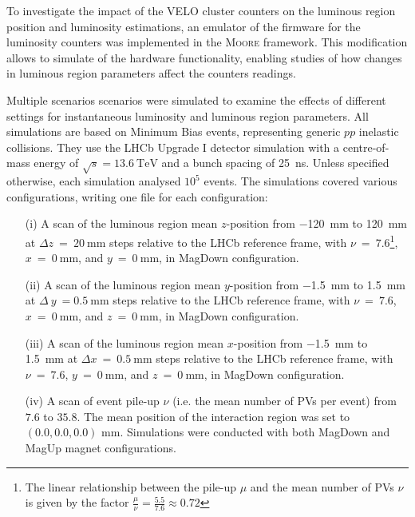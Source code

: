 To investigate the impact of the VELO cluster counters on the luminous region position and luminosity estimations, an emulator of the firmware for the luminosity counters was implemented in the \textsc{Moore} framework. This modification allows to simulate of the hardware functionality, enabling studies of how changes in luminous region parameters affect the counters readings.

Multiple scenarios scenarios were simulated to examine the effects of different settings for instantaneous luminosity and luminous region parameters. All simulations are based on Minimum Bias events, representing generic $pp$ inelastic collisions. They use the LHCb Upgrade I detector simulation with a centre-of-mass energy of $\sqrt{s} = \SI{13.6}{\tera\eV}$ and a bunch spacing of \SI{25}{\nano\second}. Unless specified otherwise, each simulation analysed $10^5$ events. The simulations covered various configurations, writing one file for each configuration:

\begin{enumerate}

    \item[(i)] A scan of the luminous region mean $z$-position from \SI{-120}{\milli\meter} to \SI{120}{\milli\meter} at $\Delta z~=~\SI{20}{\milli\meter}$ steps relative to the LHCb reference frame, with $\nu~=~7.6$\footnote{The linear relationship between the pile-up $\mu$ and the mean number of PVs $\nu$ is given by the factor $\tfrac{\mu}{\nu}=\frac{5.5}{7.6}\approx 0.72$}, $x~=~\SI{0}{\milli\meter}$, and $y~=~\SI{0}{\milli\meter}$, in MagDown configuration.

    \item[(ii)] A scan of the luminous region mean $y$-position from \SI{-1.5}{\milli\meter} to \SI{1.5}{\milli\meter} at $\Delta~y~=\SI{0.5}{\milli\meter}$ steps relative to the LHCb reference frame, with $\nu~=~7.6$, $x~=~\SI{0}{\milli\meter}$, and $z~=~\SI{0}{\milli\meter}$, in MagDown configuration.

     \item[(iii)] A scan of the luminous region mean $x$-position from \SI{-1.5}{\milli\meter} to \SI{1.5}{\milli\meter} at $\Delta x~=~\SI{0.5}{\milli\meter}$ steps relative to the LHCb reference frame, with $\nu~=~7.6$, $y~=~\SI{0}{\milli\meter}$, and $z~=~\SI{0}{\milli\meter}$, in MagDown configuration.

     \item[(iv)] A scan of event pile-up $\nu$ (i.e. the mean number of PVs per event) from $7.6$ to $35.8$. The mean position of the interaction region was set to $(0.0, 0.0, 0.0)$ mm. Simulations were conducted with both MagDown and MagUp magnet configurations.

\end{enumerate}


